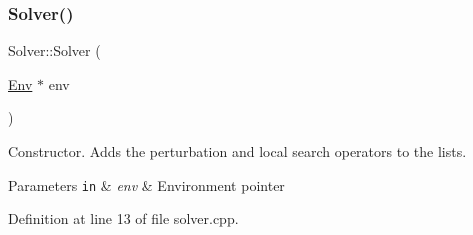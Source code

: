 \subsubsection{\texorpdfstring{Solver()}{Solver()}}
{\footnotesize\ttfamily Solver\+::\+Solver (\begin{DoxyParamCaption}\item[{\hyperlink{class_env}{Env} $\ast$}]{env }\end{DoxyParamCaption})}



Constructor. Adds the perturbation and local search operators to the lists. 


\begin{DoxyParams}[1]{Parameters}
\mbox{\tt in}  & {\em env} & Environment pointer \\
\hline
\end{DoxyParams}


Definition at line 13 of file solver.\+cpp.



